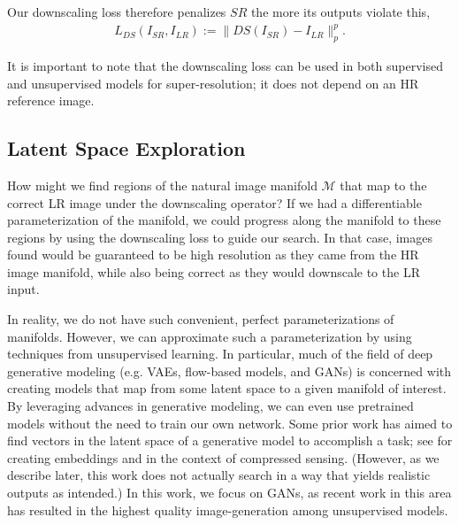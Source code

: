 \documentclass[10pt,twocolumn,letterpaper]{article}
\begin{document}
Our downscaling loss therefore penalizes $SR$ the more its outputs violate this,
\begin{align}
    L_{DS}(I_{SR},I_{LR}):= \| DS(I_{SR}) - I_{LR}\|_p^p.
\end{align}

It is important to note that the downscaling loss can be used in both supervised and unsupervised models for super-resolution; it does not depend on an HR reference image.

\subsection{Latent Space Exploration} \label{lse}
How might we find regions of the natural image manifold $\mathcal{M}$ that map to the correct LR image under the downscaling operator? If we had a differentiable parameterization of the manifold, we could progress along the manifold to these regions by using the downscaling loss to guide our search. In that case, images found would be guaranteed to be high resolution as they came from the HR image manifold, while also being correct as they would downscale to the LR input. 

In reality, we do not have such convenient, perfect parameterizations of manifolds. However, we can approximate such a parameterization by using techniques from unsupervised learning. In particular, much of the field of deep generative modeling (e.g. VAEs, flow-based models, and GANs) is concerned with creating models that map from some latent space to a given manifold of interest. By leveraging advances in generative modeling, we can even use pretrained models without the need to train our own network. Some prior work has aimed to find vectors in the latent space of a generative model to accomplish a task; see \cite{styleganembedding} for creating embeddings and \cite{bora2017compressed} in the context of compressed sensing. (However, as we describe later, this work does not actually search in a way that yields realistic outputs as intended.) In this work, we focus on GANs, as recent work in this area has resulted in the highest quality image-generation among unsupervised models.
\end{document}
